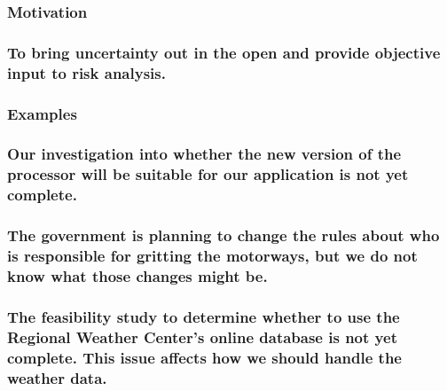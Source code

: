 \documentclass[
]{article}
\begin{document}
\hypertarget{motivation-59}{%
\subsubsection{Motivation}\label{motivation-59}}

\hypertarget{to-bring-uncertainty-out-in-the-open-and-provide-objective-input-to-risk-analysis.}{%
\subsubsection{To bring uncertainty out in the open and provide
objective input to risk
analysis.}\label{to-bring-uncertainty-out-in-the-open-and-provide-objective-input-to-risk-analysis.}}

\hypertarget{examples-40}{%
\subsubsection{Examples}\label{examples-40}}

\hypertarget{our-investigation-into-whether-the-new-version-of-the-processor-will-be-suitable-for-our-application-is-not-yet-complete.}{%
\subsubsection{Our investigation into whether the new version of the
processor will be suitable for our application is not yet
complete.}\label{our-investigation-into-whether-the-new-version-of-the-processor-will-be-suitable-for-our-application-is-not-yet-complete.}}

\hypertarget{the-government-is-planning-to-change-the-rules-about-who-is-responsible-for-gritting-the-motorways-but-we-do-not-know-what-those-changes-might-be.}{%
\subsubsection{The government is planning to change the rules about who
is responsible for gritting the motorways, but we do not know what those
changes might
be.}\label{the-government-is-planning-to-change-the-rules-about-who-is-responsible-for-gritting-the-motorways-but-we-do-not-know-what-those-changes-might-be.}}

\hypertarget{the-feasibility-study-to-determine-whether-to-use-the-regional-weather-centers-online-database-is-not-yet-complete.-this-issue-affects-how-we-should-handle-the-weather-data.}{%
\subsubsection{The feasibility study to determine whether to use the
Regional Weather Center's online database is not yet complete. This
issue affects how we should handle the weather
data.}\label{the-feasibility-study-to-determine-whether-to-use-the-regional-weather-centers-online-database-is-not-yet-complete.-this-issue-affects-how-we-should-handle-the-weather-data.}}
\end{document}

